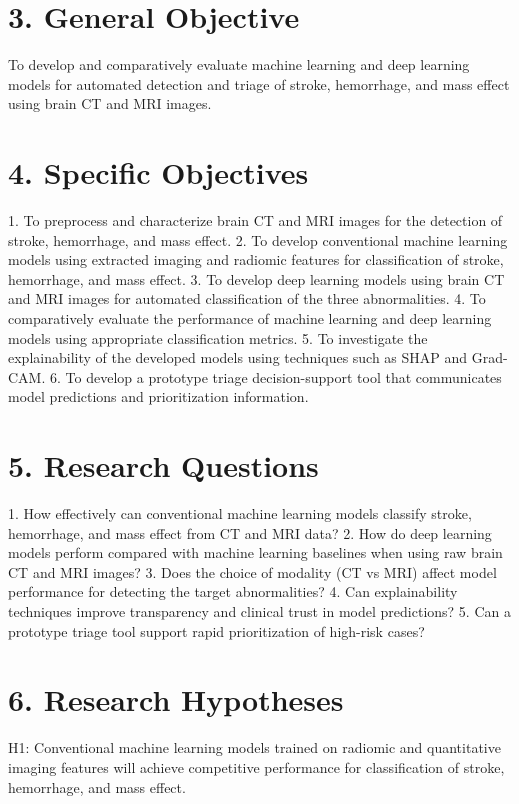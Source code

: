\documentclass[12pt,a4paper]{report}
\begin{document}
\section{3. General Objective}

To develop and comparatively evaluate machine learning and deep learning models for automated detection and triage of stroke, hemorrhage, and mass effect using brain CT and MRI images.


\section{4. Specific Objectives}

1. To preprocess and characterize brain CT and MRI images for the detection of stroke, hemorrhage, and mass effect.
2. To develop conventional machine learning models using extracted imaging and radiomic features for classification of stroke, hemorrhage, and mass effect.
3. To develop deep learning models using brain CT and MRI images for automated classification of the three abnormalities.
4. To comparatively evaluate the performance of machine learning and deep learning models using appropriate classification metrics.
5. To investigate the explainability of the developed models using techniques such as SHAP and Grad-CAM.
6. To develop a prototype triage decision-support tool that communicates model predictions and prioritization information.


\section{5. Research Questions}

1. How effectively can conventional machine learning models classify stroke, hemorrhage, and mass effect from CT and MRI data?
2. How do deep learning models perform compared with machine learning baselines when using raw brain CT and MRI images?
3. Does the choice of modality (CT vs MRI) affect model performance for detecting the target abnormalities?
4. Can explainability techniques improve transparency and clinical trust in model predictions?
5. Can a prototype triage tool support rapid prioritization of high-risk cases?


\section{6. Research Hypotheses}

H1: Conventional machine learning models trained on radiomic and quantitative imaging features will achieve competitive performance for classification of stroke, hemorrhage, and mass effect.
\end{document}
